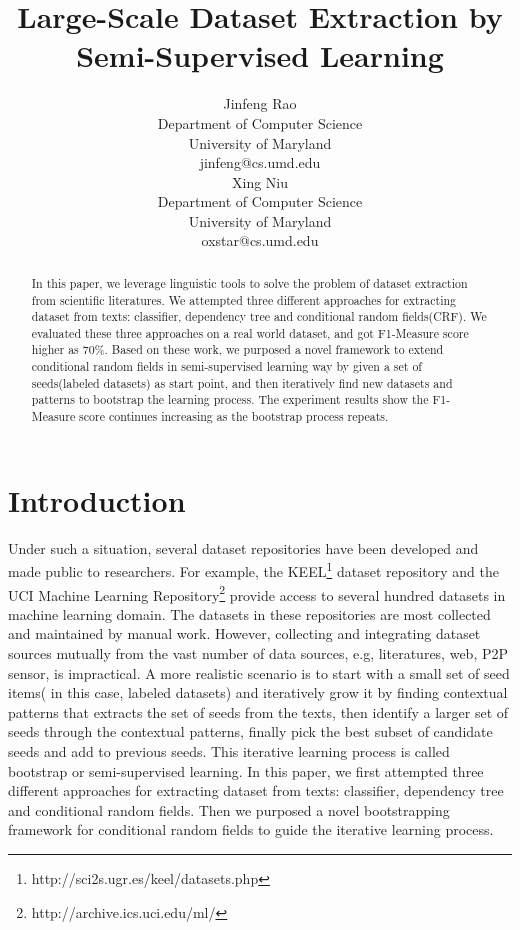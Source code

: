 \documentclass[10pt]{article}
\title{Large-Scale Dataset Extraction by Semi-Supervised Learning}
\author{Jinfeng Rao\\
  Department of Computer Science \\
  University of Maryland \\
  {jinfeng@cs.umd.edu} \\\And
  Xing Niu \\
  Department of Computer Science \\
  University of Maryland \\
  {oxstar@cs.umd.edu} \\}
\date{}
\begin{document}
\maketitle
\begin{abstract}
In this paper, we leverage linguistic tools to solve the problem of dataset extraction from scientific literatures. We attempted three different approaches for extracting dataset from texts: classifier, dependency tree and conditional random fields(CRF). We evaluated these three approaches on a real world dataset, and got F1-Measure score higher as 70\%. Based on these work, we purposed a novel framework to extend conditional random fields in semi-supervised learning way by given a set of seeds(labeled datasets) as start point, and then iteratively find new datasets and patterns to bootstrap the learning process. The experiment results show the F1-Measure score continues increasing as the bootstrap process repeats.  
\end{abstract}
\section{Introduction}

Under such a situation, several dataset repositories have been developed and made public to researchers. For example, the KEEL\footnote{http://sci2s.ugr.es/keel/datasets.php} dataset repository and the UCI Machine Learning Repository\footnote{http://archive.ics.uci.edu/ml/} provide access to several hundred datasets in machine learning domain. The datasets in these repositories are most collected and maintained by manual work. However, collecting and integrating dataset sources mutually from the vast number of data sources, e.g, literatures, web, P2P sensor, is impractical. A more realistic scenario is to start with a small set of seed items( in this case, labeled datasets) and iteratively grow it by finding contextual patterns that extracts the set of seeds from the texts, then identify a larger set of seeds through the contextual patterns, finally pick the best subset of candidate seeds and add to previous seeds. This iterative learning process is called bootstrap or semi-supervised learning. In this paper, we first attempted three different approaches for extracting dataset from texts: classifier, dependency tree and conditional random fields. Then we purposed a novel bootstrapping framework for conditional random fields to guide the iterative learning process.  \\
\end{document}
